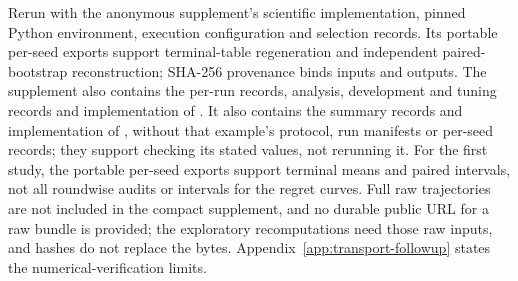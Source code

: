 Rerun  with the anonymous supplement's scientific
implementation, pinned Python environment, execution configuration and selection
records. Its portable per-seed exports support terminal-table regeneration and
independent paired-bootstrap reconstruction; SHA-256 provenance binds inputs and
outputs. The supplement also contains the per-run records, analysis, development and
tuning records and implementation of . It also contains the
summary records and implementation of , without that
example's protocol, run manifests or per-seed records; they support checking its
stated values, not rerunning it. For the first
study, the portable per-seed exports support terminal means and paired
intervals, not all roundwise audits or intervals for the regret curves. Full
raw trajectories are not included in the compact supplement, and no
durable public URL for a raw bundle is provided; the exploratory
recomputations need those raw inputs, and hashes do not replace the bytes.
Appendix~\ref{app:transport-followup} states the numerical-verification limits.
